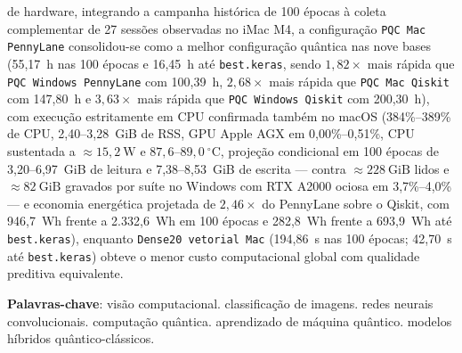 \documentclass[
    12pt,
    openright,
    oneside,
    a4paper,
    english,
    brazil
]{abntex2}
\begin{document}
\begin{resumo}
de hardware, integrando a campanha histórica de 100 épocas à coleta complementar de 27 sessões observadas no iMac M4, a configuração \texttt{PQC Mac PennyLane} consolidou-se como a melhor configuração quântica nas nove bases (55,17~h nas 100 épocas e 16,45~h até \texttt{best.keras}, sendo \(1{,}82\times\) mais rápida que \texttt{PQC Windows PennyLane} com 100,39~h, \(2{,}68\times\) mais rápida que \texttt{PQC Mac Qiskit} com 147,80~h e \(3{,}63\times\) mais rápida que \texttt{PQC Windows Qiskit} com 200,30~h), com execução estritamente em CPU confirmada também no macOS (384\%--389\% de CPU, 2,40--3,28~GiB de RSS, GPU Apple AGX em 0,00\%--0,51\%, CPU sustentada a \(\approx 15{,}2~\text{W}\) e \(87{,}6\text{--}89{,}0~^\circ\text{C}\), projeção condicional em 100 épocas de 3,20--6,97~GiB de leitura e 7,38--8,53~GiB de escrita --- contra \(\approx 228~\text{GiB}\) lidos e \(\approx 82~\text{GiB}\) gravados por suíte no Windows com RTX A2000 ociosa em 3,7\%--4,0\% --- e economia energética projetada de \(2{,}46\times\) do PennyLane sobre o Qiskit, com 946,7~Wh frente a 2.332,6~Wh em 100 épocas e 282,8~Wh frente a 693,9~Wh até \texttt{best.keras}), enquanto \texttt{Dense20 vetorial Mac} (194,86~s nas 100 épocas; 42,70~s até \texttt{best.keras}) obteve o menor custo computacional global com qualidade preditiva equivalente.

\vspace{\onelineskip}
\noindent
\textbf{Palavras-chave}: visão computacional. classificação de imagens. redes neurais convolucionais. computação quântica. aprendizado de máquina quântico. modelos híbridos quântico-clássicos.
\end{resumo}
\end{document}
